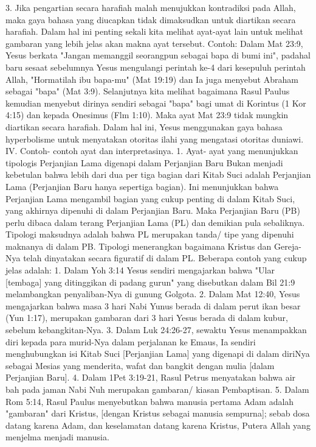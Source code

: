 3.    Jika pengartian secara harafiah malah menujukkan kontradiksi pada Allah, maka gaya bahasa yang diucapkan tidak dimaksudkan untuk diartikan secara harafiah. Dalam hal ini penting sekali kita melihat ayat-ayat lain untuk melihat gambaran yang lebih jelas akan makna ayat tersebut. Contoh: Dalam Mat 23:9, Yesus berkata "Jangan memanggil seorangpun sebagai bapa di bumi ini", padahal baru sesaat sebelumnya Yesus mengulangi perintah ke-4 dari kesepuluh perintah Allah, "Hormatilah ibu bapa-mu" (Mat 19:19) dan Ia juga menyebut Abraham sebagai "bapa" (Mat 3:9). Selanjutnya kita melihat bagaimana Rasul Paulus kemudian menyebut dirinya sendiri sebagai "bapa" bagi umat di Korintus (1 Kor 4:15) dan kepada Onesimus (Flm 1:10). Maka ayat Mat 23:9 tidak mungkin diartikan secara harafiah. Dalam hal ini, Yesus menggunakan gaya bahasa hyperbolisme untuk menyatakan otoritas ilahi yang mengatasi otoritas duniawi.
IV. Contoh- contoh ayat dan interpretasinya.
1. Ayat- ayat yang menunjukkan tipologis Perjanjian Lama digenapi dalam Perjanjian Baru
Bukan menjadi kebetulan bahwa lebih dari dua per tiga bagian dari Kitab Suci adalah Perjanjian Lama (Perjanjian Baru hanya sepertiga bagian). Ini menunjukkan bahwa Perjanjian Lama mengambil bagian yang cukup penting di dalam Kitab Suci, yang akhirnya dipenuhi di dalam Perjanjian Baru. Maka Perjanjian Baru (PB) perlu dibaca dalam terang Perjanjian Lama (PL) dan demikian pula sebaliknya.
Tipologi maksudnya adalah bahwa PL merupakan tanda/ tipe yang dipenuhi maknanya di dalam PB. Tipologi menerangkan bagaimana Kristus dan Gereja-Nya telah dinyatakan secara figuratif di dalam PL. Beberapa contoh yang cukup jelas adalah:
1.    Dalam Yoh 3:14 Yesus sendiri mengajarkan bahwa "Ular [tembaga] yang ditinggikan di padang gurun" yang disebutkan dalam Bil 21:9 melambangkan penyaliban-Nya di gunung Golgota.
2.    Dalam Mat 12:40, Yesus mengajarkan bahwa masa 3 hari Nabi Yunus berada di dalam perut ikan besar (Yun 1:17), merupakan gambaran dari 3 hari Yesus berada di dalam kubur, sebelum kebangkitan-Nya.
3.    Dalam Luk 24:26-27, sewaktu Yesus menampakkan diri kepada para murid-Nya dalam perjalanan ke Emaus, Ia sendiri menghubungkan isi Kitab Suci [Perjanjian Lama] yang digenapi di dalam diriNya sebagai Mesias yang menderita, wafat dan bangkit dengan mulia [dalam Perjanjian Baru].
4.    Dalam 1Pet 3:19-21, Rasul Petrus menyatakan bahwa air bah pada jaman Nabi Nuh merupakan gambaran/ kiasan Pembaptisan.
5.    Dalam Rom 5:14, Rasul Paulus menyebutkan bahwa manusia pertama Adam adalah "gambaran" dari Kristus, [dengan Kristus sebagai manusia sempurna]; sebab dosa datang karena Adam, dan keselamatan datang karena Kristus, Putera Allah yang menjelma menjadi manusia.
